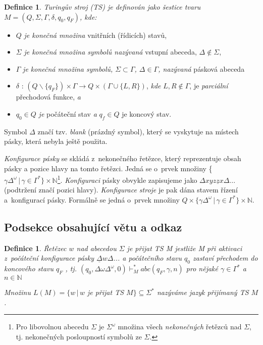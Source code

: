 \documentclass[a4paper,11pt,twocolumn]{article}
\def\Vdash{\mathop{\vdash}}
\newtheorem{definice}[thm]{Definice}
\begin{document}
\begin{definice}
    \textnormal{Turingův stroj} (TS) je definován jako šestice \label{def1}
    tvaru $M = (Q, \Sigma, \Gamma, \delta, q_0, q_F )$, kde:
\end{definice}
\begin{itemize}
    \item $Q$ \textit{je konečná množina} vnitřních (řídicích) stavů,
    \item $\Sigma$ \textit{je konečná množina symbolů nazývaná} vstupní
        abeceda, $\Delta \notin \Sigma$,
    \item $\Gamma$ \textit{je konečná množina symbolů, $\Sigma \subset \Gamma$, $\Delta \in \Gamma$,
        nazývaná} pásková abeceda
    \item $\delta$ : $(Q\backslash\{q_F \})\times\Gamma\rightarrow Q\times(\Gamma\cup\{L, R\})$, \textit{kde} $L, R \notin \Gamma$, je \textit{parciální} přechodová funkce, \textit{a}
    \item $q_0 \in Q$ \textit{je} počáteční stav \textit{a} $q_f \in Q$ je koncový stav.
\end{itemize}

Symbol $\Delta$ značí tzv. \textit{blank} (prázdný symbol), který se
vyskytuje na místech pásky, která nebyla ještě použita.

\textit{Konfigurace pásky} se skládá z~nekonečného řetězce,
který reprezentuje obsah pásky a pozice hlavy na tomto
řetězci. Jedná se o~prvek množiny \{$\gamma \Delta^\omega\, \vert\, \gamma \in \Gamma^*\} \times \mathbb{N}$\footnote{Pro libovolnou abecedu $\Sigma$ je $\Sigma^\omega$ množina všech \textit{nekonečných} řetězců nad $\Sigma$, tj. nekonečných posloupností symbolů ze $\Sigma$.}.
\textit{Konfiguraci} pásky obvykle zapisujeme jako $\Delta xyz\underline{z} x \Delta$...
(podtržení značí pozici hlavy). \textit{Konfigurace stroje} je pak
dána stavem řízení a~konfigurací pásky. Formálně se jedná
o~prvek množiny $Q \times \{\gamma \Delta^\omega\, \vert\, \gamma \in \Gamma^*\} \times \mathbb{N}$.

\subsection{Podsekce obsahující větu a odkaz}
\begin{definice}
    \textnormal{ Řetězec $w$ nad abecedou $\Sigma$ je přijat TS} M \label{def2}
    jestliže M při aktivaci z~počáteční konfigurace pásky\linebreak\newpage 
    \noindent$\underline{\Delta}w \Delta$... a počátečního stavu $q_0$ zastaví přechodem do\linebreak
    koncového stavu $q_F$ , tj. $\displaystyle (q_0,\Delta \omega \Delta^\omega, 0) \Vdash_M^* abc (q_F, \gamma, n)$ pro nějaké $\gamma \in \Gamma^*$ a $n \in \mathbb{N}$

Množinu $L(M) = \{w \, \vert\, w$ je přijat TS $M\}  \subseteq \Sigma^*$ nazýváme jazyk přijímaný \textnormal{TS} $M$.
\end{definice}
\end{document}
